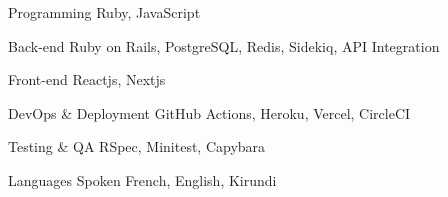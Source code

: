 
\begin{cvskills}

  \cvskill
    {Programming} %
    {Ruby, JavaScript}

  \cvskill
    {Back-end} %
    {Ruby on Rails, PostgreSQL, Redis, Sidekiq, API Integration}

  \cvskill
    {Front-end} %
    {Reactjs, Nextjs}

  \cvskill
    {DevOps \& Deployment} %
    {GitHub Actions, Heroku, Vercel, CircleCI}

  \cvskill
    {Testing \& QA} %
    {RSpec, Minitest, Capybara}

  \cvskill
    {Languages Spoken} %
    {French, English, Kirundi}

\end{cvskills}
